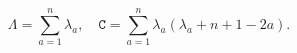 \begin{equation}
\Lambda = \sum_{a=1}^{n} \lambda_{a}, \quad \texttt{C} = 
\sum_{a=1}^{n} \lambda_{a}(\lambda_{a} + n+1-2a).
\label{eq:CasimirEvalues}
\end{equation}


